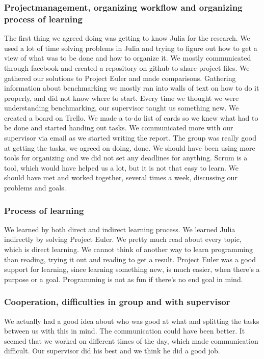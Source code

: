 \documentclass[a4paper, 11pt, titlepage]{article}
\begin{document}
\subsubsection{Projectmanagement, organizing workflow and organizing process of learning}
The first thing we agreed doing was getting to know Julia for the research. We used a lot of time solving problems in Julia and trying to figure out how to get a view of what was to be done and how to organize it. We mostly communicated through facebook and created a repository on github to share project files. We gathered our solutions to Project Euler and made comparisons. Gathering information about benchmarking we mostly ran into walls of text on how to do it properly, and did not know where to start. Every time we thought we were understanding benchmarking, our supervisor taught us something new. We created a board on Trello. We made a to-do list of cards so we knew what had to be done and started handing out tasks. We communicated more with our supervisor via email as we started writing the report. The group was really good at getting the tasks, we agreed on doing, done. We should have been using more tools for organizing and we did not set any deadlines for anything. Scrum is a tool, which would have helped us a lot, but it is not that easy to learn. We should have met and worked together, several times a week, discussing our problems and goals. 

\subsubsection{Process of learning}
We learned by both direct and indirect learning process. We learned Julia indirectly by solving Project Euler. We pretty much read about every topic, which is direct learning. We cannot think of another way to learn programming than reading, trying it out and reading to get a result. Project Euler was a good support for learning, since learning something new, is much easier, when there's a purpose or a goal. Programming is not as fun if there's no end goal in mind.

\subsubsection{Cooperation, difficulties in group and with supervisor}
We actually had a good idea about who was good at what and splitting the tasks between us with this in mind. The communication could have been better. It seemed that we worked on different times of the day, which made communication difficult. Our supervisor did his best and we think he did a good job.
\end{document}
